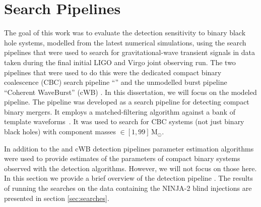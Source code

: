\section{Search Pipelines}
\label{sec:pipelines}

The goal of this work was to evaluate the detection sensitivity to
binary black hole systems, modelled from the latest numerical
simulations, using the search pipelines that were used to search for
gravitational-wave transient signals in data taken during the final
initial LIGO and Virgo joint observing run.  The two pipelines that
were used to do this were the dedicated compact binary coalescence
(CBC) search pipeline ``\ihope{}'' \cite{Abbott:2009tt, Abbott:2009qj,
Abadie:2011kd, Colaboration:2011np, Aasi:2012rja, Babak:2012zx}
and the unmodelled burst pipeline ``Coherent WaveBurst'' (cWB)
\cite{Abbott:2007wu, Abadie:2010mt, Abadie:2012rq, Virgo:2012aa}. 
In this dissertation, we will focus on the modeled \ihope{} pipeline.
The \ihope{} pipeline was developed as a search pipeline for detecting
compact binary mergers. It employs a matched-filtering algorithm
against a bank of template waveforms~\cite{Babak:2012zx}. 
It was used to search for CBC systems (not just binary black
holes) with component masses $\in [1,99]\, \mathrm{M}_{\odot}$. 

In addition to the \ihope{} and cWB detection pipelines parameter 
estimation algorithms were used to provide estimates of the parameters of
compact binary systems observed with the detection algorithms. 
However, we will not focus on those here.
In this section we provide a brief overview of the detection 
pipeline \ihope{}.
The results of running the \ihope{} searches on the data containing the NINJA-2
blind injections are presented in section \ref{sec:searches}.

